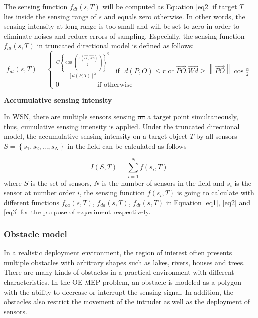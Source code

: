 \documentclass[final]{elsarticle}
\begin{document}
The sensing function $f_{dt}(s,T)$ will be computed as Equation \eqref{eq2} if target $T$ lies inside the sensing range of $s$ and equals zero otherwise. In other words, the sensing intensity at long range is too small and will be set to zero in order to eliminate noises and reduce errors of sampling. Especially, the sensing function $f_{dt}(s,T)$ in truncated directional model is defined as follows:
\begin{equation}
\label{eq3}
f_{dt}({s},T) = \left\{
\begin{aligned}
 \frac {{C{{\left\{ {\cos \left( {\frac{{\angle (\overrightarrow {PT} ,\overrightarrow {Wd}) }}{2}} \right)} \right\}}}^\beta }} {{{{\left[ {d(P,T)} \right]}^\lambda }}} \:\:\:\:\text{if} \:\:\: d(P,O) \le r \text{ or } \overrightarrow {PO} .\overrightarrow {Wd}  \ge \left\| {\overrightarrow {PO} } \right\|\cos \frac{\alpha}{2} \\
 0 \:\:\:\:\:\:\:\:\:\:\:\:\:\:\:\:\:\:\:\:\:\:\:\:\:\text{if  otherwise}\:\:\:\:\:\:\:\:\:\:\:\:\:\:\:\:\:\:\:\:\:\:\:\:\:\:\:\:\:\:\:\:\:\:\:\:\:\:\:\:\:\:\:\:\:\:\:\:\:\:\:\:\:\:\:\:\:\:
\end{aligned}
\right.
\end{equation}

\noindent\textbf{Accumulative sensing intensity}

In WSN, there are multiple sensors sensing \sout{on} a target point simultaneously, thus, cumulative sensing intensity is applied. Under the truncated directional model, the accumulative sensing intensity on a target object $ T $ by all sensors $S = \left\{ {{s_1},{s_2},...,{s_N}} \right\}$ in the field can be calculated as follows

\begin{equation}
\label{eq4}
I(S, T) = \sum\limits_{i = 1}^{N} {f({s_i},T)} 
\end{equation}
where $ S $ is the set of sensors, $ N $ is the number of sensors in the field and $s_i$ is the sensor at number order $ i $, the sensing function $ f({s_i},T)$ is going to calculate with different functions $f_{oa}({s},T)$,  $ f_{da}({s},T) $, $f_{dt}({s},T)$ in Equation \eqref{eq1}, \eqref{eq2} and \eqref{eq3} for the purpose of experiment respectively. 

\subsubsection{Obstacle model}
In a realistic deployment environment, the region of interest often presents multiple obstacles with arbitrary shapes such as lakes, rivers, houses and trees. There are many kinds of obstacles in a practical environment with different characteristics. In the OE-MEP problem, an obstacle is modeled as a polygon with the ability to decrease or interrupt the sensing signal. In addition, the obstacles also restrict the movement of the intruder as well as the deployment of sensors. 
\end{document}
